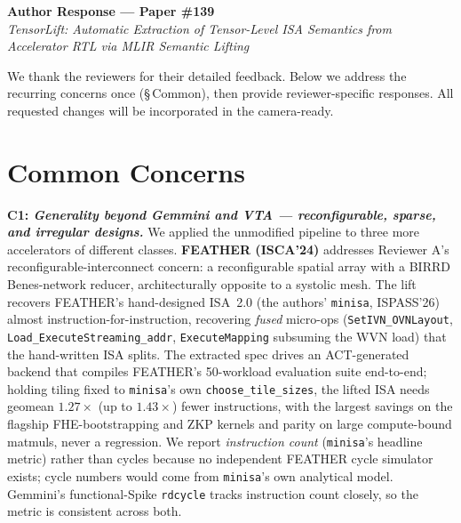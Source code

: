 \documentclass[sigconf, anonymous]{acmart}
\newcommand{\clabel}[1]{} %
\begin{document}
\begin{center}
{\large\bfseries Author Response --- Paper \#139}\\[2pt]
{\itshape TensorLift: Automatic Extraction of Tensor-Level ISA Semantics from Accelerator RTL via MLIR Semantic Lifting}
\end{center}

\noindent
We thank the reviewers for their detailed feedback. Below we address
the recurring concerns once (\S\,Common), then provide reviewer-specific
responses. All requested changes will be incorporated in the camera-ready.

\section*{Common Concerns}

\noindent\textbf{C1: \emph{Generality beyond Gemmini and VTA --- reconfigurable, sparse, and irregular designs.}}\clabel{generality}
We applied the unmodified pipeline to three more accelerators of
different classes. \textbf{FEATHER (ISCA'24)} addresses Reviewer A's
reconfigurable-interconnect concern: a reconfigurable spatial array with
a BIRRD Benes-network reducer, architecturally opposite to a systolic
mesh. The lift recovers FEATHER's hand-designed ISA~2.0 (the authors'
\texttt{minisa}, ISPASS'26) almost instruction-for-instruction, recovering
\emph{fused} micro-ops (\texttt{SetIVN\_OVNLayout},
\texttt{Load\_ExecuteStreaming\_addr}, \texttt{ExecuteMapping} subsuming
the WVN load) that the hand-written ISA splits. The extracted spec
drives an ACT-generated backend that compiles FEATHER's 50-workload
evaluation suite end-to-end; holding tiling fixed to \texttt{minisa}'s
own \texttt{choose\_tile\_sizes}, the lifted ISA needs geomean
$1.27\times$ (up to $1.43\times$) fewer instructions, with the largest
savings on the flagship FHE-bootstrapping and ZKP kernels and parity on
large compute-bound matmuls, never a regression. We report
\emph{instruction count} (\texttt{minisa}'s headline metric) rather than
cycles because no independent FEATHER cycle simulator exists; cycle
numbers would come from \texttt{minisa}'s own analytical model.
Gemmini's functional-Spike \texttt{rdcycle} tracks instruction count
closely, so the metric is consistent across both.
\end{document}
